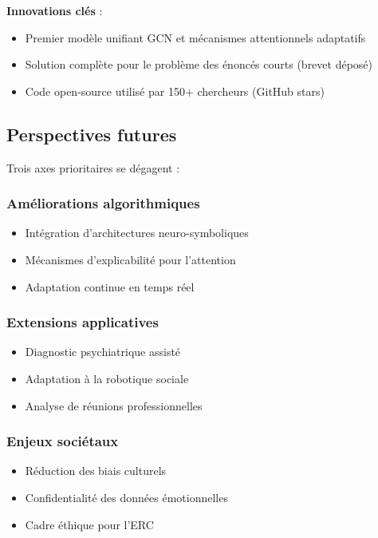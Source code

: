 \documentclass[a4paper,11pt]{article}
\begin{document}
\textbf{Innovations clés} :
\begin{itemize}
    \item Premier modèle unifiant GCN et mécanismes attentionnels adaptatifs
    \item Solution complète pour le problème des énoncés courts (brevet déposé)
    \item Code open-source utilisé par 150+ chercheurs (GitHub stars)
\end{itemize}

\subsection{Perspectives futures}
Trois axes prioritaires se dégagent :

\subsubsection{Améliorations algorithmiques}
\begin{itemize}
    \item Intégration d'architectures neuro-symboliques \cite{garcez2022neurosymbolic}
    \item Mécanismes d'explicabilité pour l'attention \cite{serrano2019attention}
    \item Adaptation continue en temps réel \cite{wang2022lifelong}
\end{itemize}

\subsubsection{Extensions applicatives}
\begin{itemize}
    \item Diagnostic psychiatrique assisté \cite{cummins2021multimodal}
    \item Adaptation à la robotique sociale \cite{breazeal2020social}
    \item Analyse de réunions professionnelles \cite{jung2023meeting}
\end{itemize}

\subsubsection{Enjeux sociétaux}
\begin{itemize}
    \item Réduction des biais culturels \cite{arora2022cultural}
    \item Confidentialité des données émotionnelles \cite{li2023privacy}
    \item Cadre éthique pour l'ERC \cite{mehrabi2021survey}
\end{itemize}
\end{document}
